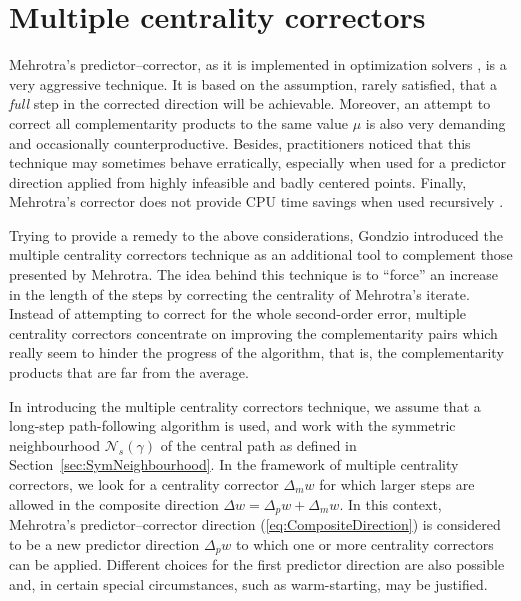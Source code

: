 %
%
\section{Multiple centrality correctors}
\label{sec:MultipleCC}

Mehrotra's predictor--corrector, as it is implemented in optimization 
solvers \cite{LustigMarstenShanno,Mehrotra92}, is a very aggressive 
technique. It is based on the assumption, rarely satisfied, that a 
{\it full} step in the corrected direction will be achievable.
Moreover, an attempt to correct all complementarity products to the 
same value $\mu$ is also very demanding and occasionally
counterproductive. 
Besides, practitioners noticed that this technique may sometimes 
behave erratically, especially when used for a predictor direction 
applied from highly infeasible and badly centered points. 
Finally, Mehrotra's corrector does not provide CPU time savings 
when used recursively \cite{CarpenterLustigMulveyShanno}.

Trying to provide a remedy to the above considerations, Gondzio 
\cite{Gondzio96} introduced the multiple centrality correctors technique 
as an additional tool to complement those presented by Mehrotra. 
The idea behind this technique is to ``force'' an increase in the 
length of the steps by correcting the centrality of Mehrotra's 
iterate.
Instead of attempting to correct for the whole second-order error,
multiple centrality correctors 
concentrate on improving the complementarity pairs which really seem 
to hinder the progress of the algorithm, that is, the complementarity products 
that are far from the average.

In introducing the multiple centrality correctors technique,
we assume that a long-step path-following algorithm is used, 
and work with the symmetric neighbourhood $\mathcal{N}_s(\gamma)$
of the central path as defined in Section~\ref{sec:SymNeighbourhood}.
In the framework of multiple centrality correctors, we look for a 
centrality corrector $\Delta_m w$ for which larger
steps are allowed in the composite direction $\Delta w =\Delta_p w+\Delta_m w$.
In this context,
Mehrotra's predictor--corrector direction 
(\ref{eq:CompositeDirection}) is considered to be a new predictor direction
$\Delta_p w$ to which one or more centrality correctors can be applied. 
Different choices for the first predictor direction are also possible and, 
in certain special circumstances, such as warm-starting, 
may be justified.

